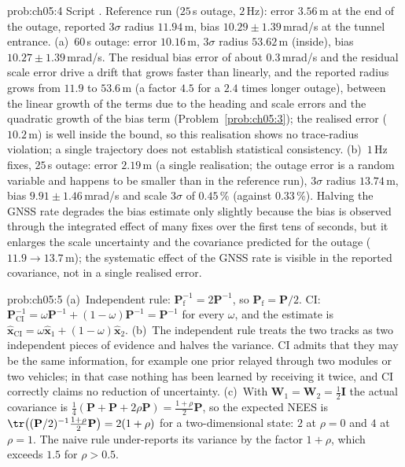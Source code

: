\begin{sol}{prob:ch05:4}
Script . Reference run ($25$\,s outage, $2$\,Hz): error $3.56$\,m at the end of the outage, reported $3\sigma$ radius $11.94$\,m, bias $10.29\pm1.39$\,mrad/s at the tunnel entrance. (a)~$60$\,s outage: error $10.16$\,m, $3\sigma$ radius $53.62$\,m (inside), bias $10.27\pm1.39$\,mrad/s. The residual bias error of about $0.3$\,mrad/s and the residual scale error drive a drift that grows faster than linearly, and the reported radius grows from $11.9$ to $53.6$\,m (a factor $4.5$ for a $2.4$ times longer outage), between the linear growth of the terms due to the heading and scale errors and the quadratic growth of the bias term (Problem~\ref{prob:ch05:3}); the realised error ($10.2$\,m) is well inside the bound, so this realisation shows no trace-radius violation; a single trajectory does not establish statistical consistency. (b)~$1$\,Hz fixes, $25$\,s outage: error $2.19$\,m (a single realisation; the outage error is a random variable and happens to be smaller than in the reference run), $3\sigma$ radius $13.74$\,m, bias $9.91\pm1.46$\,mrad/s and scale $3\sigma$ of $0.45$\,\% (against $0.33$\,\%). Halving the GNSS rate degrades the bias estimate only slightly because the bias is observed through the integrated effect of many fixes over the first tens of seconds, but it enlarges the scale uncertainty and the covariance predicted for the outage ($11.9\to13.7$\,m); the systematic effect of the GNSS rate is visible in the reported covariance, not in a single realised error.
\end{sol}

\begin{sol}{prob:ch05:5}
(a)~Independent rule: $\mathbf{P}_{\mathrm{f}}^{-1}=2\mathbf{P}^{-1}$, so $\mathbf{P}_{\mathrm{f}}=\mathbf{P}/2$. CI: $\mathbf{P}_{\mathrm{CI}}^{-1}=\omega\mathbf{P}^{-1}+(1-\omega)\mathbf{P}^{-1}=\mathbf{P}^{-1}$ for every $\omega$, and the estimate is $\widehat{\mathbf{x}}_{\mathrm{CI}}=\omega\widehat{\mathbf{x}}_{1}+(1-\omega)\widehat{\mathbf{x}}_{2}$. (b)~The independent rule treats the two tracks as two independent pieces of evidence and halves the variance. CI admits that they may be the same information, for example one prior relayed through two modules or two vehicles; in that case nothing has been learned by receiving it twice, and CI correctly claims no reduction of uncertainty. (c)~With $\mathbf{W}_{1}=\mathbf{W}_{2}=\tfrac{1}{2}\mathbf{I}$ the actual covariance is $\tfrac{1}{4}(\mathbf{P}+\mathbf{P}+2\rho\mathbf{P})=\tfrac{1+\rho}{2}\mathbf{P}$, so the expected NEES is $\tr\big((\mathbf{P}/2)^{-1}\tfrac{1+\rho}{2}\mathbf{P}\big)=2(1+\rho)$ for a two-dimensional state: $2$ at $\rho=0$ and $4$ at $\rho=1$. The naive rule under-reports its variance by the factor $1+\rho$, which exceeds $1.5$ for $\rho>0.5$.
\end{sol}

